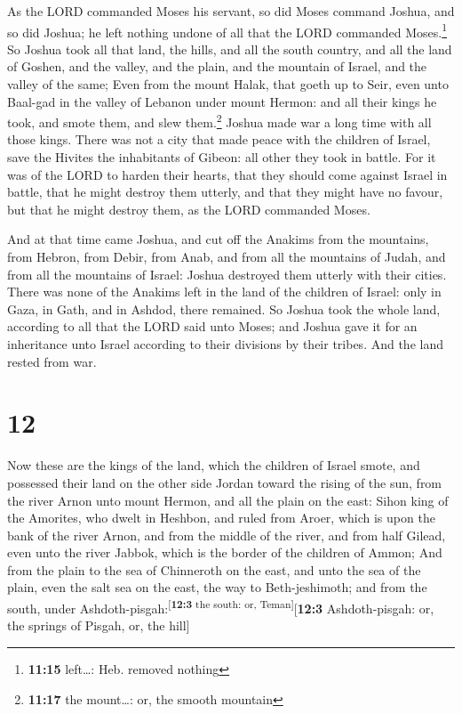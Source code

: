  As the LORD commanded Moses his servant, so did Moses
command Joshua, and so did Joshua; he left nothing undone of all that
the LORD commanded Moses.\footnote{\textbf{11:15} left\ldots: Heb.
  removed nothing}  So Joshua took all that land, the
hills, and all the south country, and all the land of Goshen, and the
valley, and the plain, and the mountain of Israel, and the valley of the
same;  Even from the mount Halak, that goeth up to Seir,
even unto Baal-gad in the valley of Lebanon under mount Hermon: and all
their kings he took, and smote them, and slew them.\footnote{\textbf{11:17}
  the mount\ldots: or, the smooth mountain}  Joshua made
war a long time with all those kings.  There was not a
city that made peace with the children of Israel, save the Hivites the
inhabitants of Gibeon: all other they took in battle. 
For it was of the LORD to harden their hearts, that they should come
against Israel in battle, that he might destroy them utterly, and that
they might have no favour, but that he might destroy them, as the LORD
commanded Moses.

 And at that time came Joshua, and cut off the Anakims
from the mountains, from Hebron, from Debir, from Anab, and from all the
mountains of Judah, and from all the mountains of Israel: Joshua
destroyed them utterly with their cities.  There was none
of the Anakims left in the land of the children of Israel: only in Gaza,
in Gath, and in Ashdod, there remained.  So Joshua took
the whole land, according to all that the LORD said unto Moses; and
Joshua gave it for an inheritance unto Israel according to their
divisions by their tribes. And the land rested from war.

\hypertarget{section-11}{%
\section{12}\label{section-11}}

 Now these are the kings of the land, which the children
of Israel smote, and possessed their land on the other side Jordan
toward the rising of the sun, from the river Arnon unto mount Hermon,
and all the plain on the east:  Sihon king of the
Amorites, who dwelt in Heshbon, and ruled from Aroer, which is upon the
bank of the river Arnon, and from the middle of the river, and from half
Gilead, even unto the river Jabbok, which is the border of the children
of Ammon;  And from the plain to the sea of Chinneroth on
the east, and unto the sea of the plain, even the salt sea on the east,
the way to Beth-jeshimoth; and from the south, under
Ashdoth-pisgah:\textsuperscript{{[}\textbf{12:3} the south: or,
Teman{]}}{[}\textbf{12:3} Ashdoth-pisgah: or, the springs of Pisgah, or,
the hill{]}

